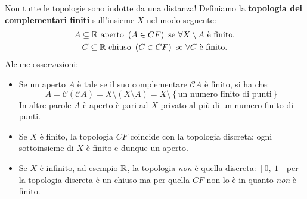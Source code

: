 \begin{attention}
Non tutte le topologie sono indotte da una distanza! Definiamo la \textbf{topologia dei complementari finiti} sull'insieme $X$ nel modo seguente:
\begin{gather*}
A\subseteq \mathbb{R} \text{ aperto } \left(A\in CF\right) \text{ se } \forall X\setminus A \text{ è finito.}\\
C\subseteq \mathbb{R} \text{ chiuso } \left(C\in CF\right) \text{ se } \forall C \text{ è finito.}
\end{gather*}
Alcune osservazioni:
\begin{itemize}
\item Se un aperto $A$ è tale se il suo complementare $\mathcal{C}A$ è finito, si ha che:
\begin{equation}
A=\mathcal{C}\left(\mathcal{C}A\right)=X\setminus\left(X\setminus A\right)=X\setminus\left\{\text{un numero finito di punti}\right\}
\end{equation}
In altre parole $A$ è aperto è pari ad $X$ privato al più di un numero finito di punti.
\item Se $X$ è finito, la topologia $CF$ coincide con la topologia discreta: ogni sottoinsieme di $X$ è finito e dunque un aperto.
\item Se $X$ è infinito, ad esempio $\mathbb{R}$, la topologia \textit{non} è quella discreta: $[0,\ 1]$ per la topologia discreta è un chiuso ma per quella $CF$ non lo è in quanto \textit{non} è finito.
\end{itemize}
\end{attention}
